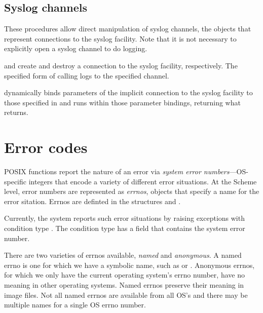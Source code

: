 \subsection*{Syslog channels}
%
These procedures allow direct manipulation of syslog channels, the
objects that represent connections to the syslog facility.  Note that
it is not necessary to explicitly open a syslog channel to do logging.

\begin{protos}
\end{protos}
\noindent
{} and  create and
destroy a connection to the syslog facility, respectively.  The
specified form of calling  logs to the specified channel.

 dynamically binds parameters of the
implicit connection to the syslog facility to those specified in 
 and runs  within those parameter bindings,
returning what  returns.

\section{Error codes}

POSIX functions report the nature of an error via \textit{system error
  numbers}---OS-specific integers that encode a variety of different
error situations.  At the Scheme level, error numbers are represented
as \textit{errnos}, objects that specify a name for the error
sitation.  Errnos are definted in the structures 
and .

Currently, the system reports such error situations by raising
exceptions with condition type .  The
 condition type has a field  that contains
the system error number.

There are two varieties of errnos available, {\em named} and {\em anonymous}.
A named errno is one for which we have a symbolic name, such as 
 or .  
Anonymous errnos, for which we only have the current operating system's
 errno number, have no meaning in other operating systems.
Named errnos preserve their meaning in image files.
Not all named errnos are available from all OS's and
 there may be multiple names for a single OS errno number.

